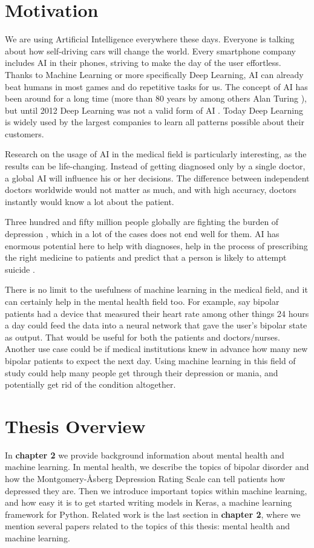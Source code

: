 \section{Motivation}

We are using Artificial Intelligence everywhere these days. Everyone is talking about how self-driving cars will change the world. Every smartphone company includes AI in their phones, striving to make the day of the user effortless. Thanks to Machine Learning or more specifically Deep Learning, AI can already beat humans in most games and do repetitive tasks for us. The concept of AI has been around for a long time (more than 80 years by among others Alan Turing \cite{turing1938}), but until 2012 Deep Learning was not a valid form of AI \cite{topol2019}. Today Deep Learning is widely used by the largest companies to learn all patterns possible about their customers. 

Research on the usage of AI in the medical field is particularly interesting, as the results can be life-changing. Instead of getting diagnosed only by a single doctor, a global AI will influence his or her decisions. The difference between independent doctors worldwide would not matter as much, and with high accuracy, doctors instantly would know a lot about the patient. 

Three hundred and fifty million people globally are fighting the burden of depression \cite{burden_of_depression}, which in a lot of the cases does not end well for them. AI has enormous potential here to help with diagnoses, help in the process of prescribing the right medicine to patients and predict that a person is likely to attempt suicide \cite{topol2019}. 

There is no limit to the usefulness of machine learning in the medical field, and it can certainly help in the mental health field too. For example, say bipolar patients had a device that measured their heart rate among other things 24 hours a day could feed the data into a neural network that gave the user's bipolar state as output. That would be useful for both the patients and doctors/nurses. Another use case could be if medical institutions knew in advance how many new bipolar patients to expect the next day. Using machine learning in this field of study could help many people get through their depression or mania, and potentially get rid of the condition altogether.

\section{Thesis Overview}
In \textbf{chapter 2} we provide background information about mental health and machine learning. In mental health, we describe the topics of bipolar disorder and how the Montgomery-Åsberg Depression Rating Scale can tell patients how depressed they are. Then we introduce important topics within machine learning, and how easy it is to get started writing models in Keras, a machine learning framework for Python. Related work is the last section in \textbf{chapter 2}, where we mention several papers related to the topics of this thesis: mental health and machine learning. \\

